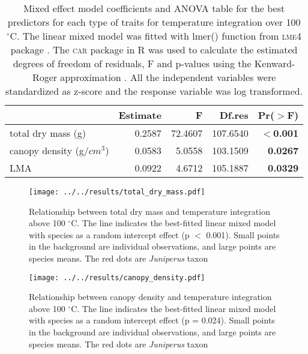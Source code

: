 \documentclass[12pt]{report}
\newcommand{\pkg}[1]{\textsc{#1}}
\begin{document}


\begin{table}
\centering
\caption{Mixed effect model coefficients and ANOVA table for the best predictors for each type of traits for temperature integration over 100 $^{\circ}$C. The linear mixed model was fitted with lmer() function from \pkg{lme4} package \citep{bates2009package}. The \pkg{car} package in R \citep{fox2013hypothesis} was used to calculate the estimated degrees of freedom of residuals, F and p-values using the Kenward-Roger approximation \citep{kenward1997small}. All the independent variables were standardized  as z-score and the response variable was log transformed.}
\vspace{0.5 cm}
\begin{tabular}{lrrrr}
  \hline
 &  Estimate & F  & Df.res & Pr($>$F) \\ 
  \hline 
  total dry mass (g) & 0.2587 & 72.4607  & 107.6540 & \textbf{$<$0.001} \\ 
  canopy density (g/{$cm^3$}) & 0.0583 & 5.0558  & 103.1509 & \textbf{0.0267} \\ 
  LMA & 0.0922 & 4.6712 &  105.1887 & \textbf{0.0329} \\ 
   \hline
\end{tabular}
\label{tab:fandpstatfortemp}
\end{table}


\begin{figure}
    \centering
    \texttt{[image: ../../results/total\_dry\_mass.pdf]}
    \caption[Dry mass effect on temperature integration]{\label{fig:dm-tempint}Relationship between total dry mass and temperature integration above 100 $^{\circ}$C. The line indicates the best-fitted linear mixed model with species as a random intercept effect (p $<$ 0.001). Small points in the background are individual observations, and large points are species means. The red dots are \emph{Juniperus} taxon}
\end{figure}


\begin{figure}
    \centering
    \texttt{[image: ../../results/canopy\_density.pdf]}
    \caption[short version]{\label{fig:canopyden-tempint} Relationship between canopy density and temperature integration above 100 $^{\circ}$C. The line indicates the best-fitted linear mixed model with species as a random intercept effect (p = 0.024). Small points in the background are individual observations, and large points are species means. The red dots are \emph{Juniperus} taxon}
\end{figure}
\end{document}

